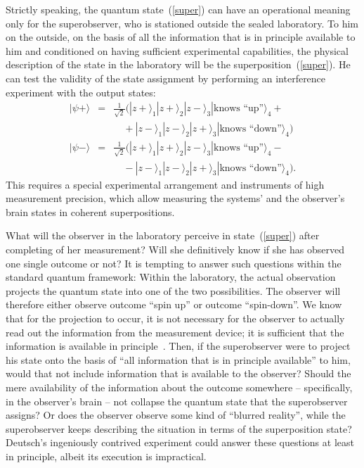 \documentclass[12pt,a4]{article}
\begin{document}
Strictly speaking, the quantum state~(\ref{super}) can have an operational meaning only for the superobserver, who is stationed outside the sealed laboratory. To him on the outside, on the basis of all the information that is in principle available to him and conditioned on having sufficient experimental capabilities, the physical description of the state in the laboratory will be the superposition~(\ref{super}). He can test the validity of the state assignment by performing an interference experiment with the output states:
\begin{eqnarray}
|\psi+\rangle &=&\frac{1}{\sqrt{2}} (|z+\rangle_1|z+\rangle_2|z-\rangle_3|\mbox{knows ``up''}\rangle_4 + \nonumber \\
&& \quad {} + |z-\rangle_1|z-\rangle_2|z+\rangle_3 |\mbox{knows ``down''}\rangle_4) \nonumber \\
|\psi- \rangle &=& \frac{1}{\sqrt{2}} (|z+\rangle_1|z+\rangle_2|z-\rangle_3|\mbox{knows ``up''}\rangle_4 - \nonumber\\
&& \quad {} - |z-\rangle_1|z-\rangle_2|z+\rangle_3 |\mbox{knows ``down''}\rangle_4). \nonumber
\end{eqnarray}
This requires a special experimental arrangement and instruments of high measurement precision, which allow measuring the systems' and the observer's brain states in coherent superpositions.

What will the observer in the laboratory perceive in state~(\ref{super}) after completing of her measurement? Will she definitively know if she has observed one single outcome or not? It is tempting to answer such questions within the standard quantum framework: Within the laboratory, the actual observation projects the quantum state into one of the two possibilities. The observer will therefore either observe outcome ``spin up'' or outcome ``spin-down''. We know that for the projection to occur, it is not necessary for the observer to actually read out the information from the measurement device; it is sufficient that the information is available in principle~\cite{mandel}. Then, if the superobserver were to project his state onto the basis of ``all information that is in principle available'' to him, would that not include information that is available to the observer? Should the mere availability of the information about the outcome somewhere -- specifically, in the observer's brain -- not collapse the quantum state that the superobserver assigns? Or does the observer observe some kind of ``blurred reality'', while the superobserver keeps describing the situation in terms of the superposition state? Deutsch's ingeniously contrived experiment could answer these questions at least in principle, albeit its execution is impractical. 
\end{document}
